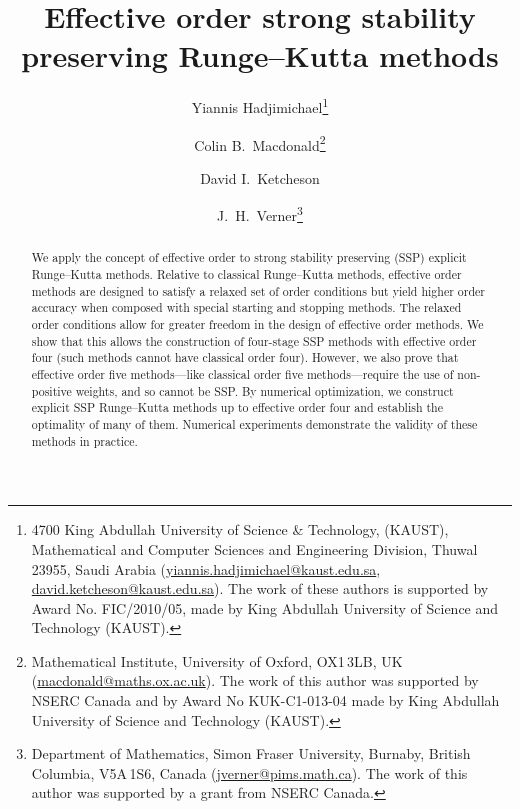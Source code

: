 \documentclass[10pt,a4paper,oneside]{article}
\title{Effective order strong stability preserving Runge--Kutta methods}
\author{
	Yiannis Hadjimichael\footnote{4700 King Abdullah University of Science \& Technology, 
	(KAUST), Mathematical and Computer Sciences and Engineering Division, Thuwal 23955, 
	Saudi Arabia
	(\url{yiannis.hadjimichael@kaust.edu.sa}, 
	\url{david.ketcheson@kaust.edu.sa}).
	The work of these authors is supported by Award No. FIC/2010/05, made by King 
	Abdullah University of Science and Technology (KAUST).}
    	\and 
    	Colin B.~Macdonald\thanks{Mathematical Institute, University of Oxford, OX1\,3LB, UK 
    	(\url{macdonald@maths.ox.ac.uk}).
    	The work of this author was supported by NSERC 
    	Canada and by Award No KUK-C1-013-04 made by King Abdullah University of Science 
    	and Technology (KAUST).}
    	\and 
    	David I.~Ketcheson\footnotemark[1]
    	\and 
    	J.~H.~Verner\thanks{Department of Mathematics, Simon Fraser University,
    	Burnaby, British Columbia, V5A\,1S6, Canada
    	(\url{jverner@pims.math.ca}).
    	The work of this author was supported by a grant from NSERC Canada.}
}
\numberwithin{theorem}{section}
\numberwithin{equation}{section}
\numberwithin{table}{section}
\numberwithin{figure}{section}
\begin{document}
	\maketitle
	
	
	\begin{abstract}
  		We apply the concept of effective order to strong stability preserving 
  		(SSP) explicit Runge--Kutta methods.
  		Relative to classical Runge--Kutta methods, effective order methods 
  		are designed to satisfy a relaxed set of order conditions but yield higher 
  		order accuracy  when composed with special starting and stopping methods. 
         The relaxed order conditions allow for greater freedom in the design
         of effective order methods. 
         We show that this allows the construction of four-stage SSP methods with 
         effective order four (such methods cannot have classical order four). 
         However, we also prove that effective order five methods---like classical
         order five methods---require the use of non-positive weights, and so cannot
         be SSP.
         By numerical optimization, we construct explicit SSP Runge--Kutta methods 
         up to effective order four and establish the optimality of many of them.
  		Numerical experiments demonstrate the validity of these methods in
  		practice.
	\end{abstract}

	
	
	
	
	
	
	


	
\end{document}
